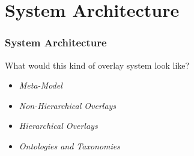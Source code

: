 \section{System Architecture}
\begin{frame}
\frametitle{System Architecture}
What would this kind of overlay system look like?
\begin{itemize}
\item<2-> \textit{Meta-Model}
\item<3-> \textit{Non-Hierarchical Overlays}
\item<4-> \textit{Hierarchical Overlays}
\item<5-> \textit{Ontologies and Taxonomies}
\end{itemize}
\end{frame}